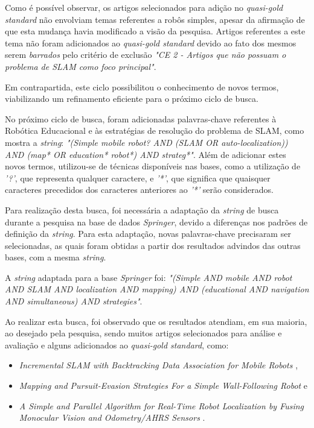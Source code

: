 		Como é possível observar, os artigos selecionados para adição no \textit{quasi-gold standard} não envolviam temas referentes a robôs simples, apesar da afirmação de que esta mudança havia modificado a visão da pesquisa. Artigos referentes a este tema não foram adicionados ao \textit{quasi-gold standard} devido ao fato dos mesmos serem \textit{barrados} pelo critério de exclusão \textit{"CE 2 - Artigos que não possuam o problema de SLAM como foco principal"}.

		Em contrapartida, este ciclo possibilitou o conhecimento de novos termos, viabilizando um refinamento eficiente para o próximo ciclo de busca.

		No próximo ciclo de busca, foram adicionadas palavras-chave referentes à Robótica Educacional e às estratégias de resolução do problema de SLAM, como mostra a \textit{string}: \textit{"(Simple mobile robot? AND (SLAM OR auto-localization)) AND (map* OR education* robot*) AND strateg*"}. Além de adicionar estes novos termos, utilizou-se de técnicas disponíveis nas bases, como a utilização de \textit{'?'}, que representa qualquer caractere, e \textit{'*'}, que significa que quaisquer caracteres precedidos dos caracteres anteriores ao \textit{'*'} serão considerados.

		Para realização desta busca, foi necessária a adaptação da \textit{string} de busca durante a pesquisa na base de dados \textit{Springer}, devido a diferenças nos padrões de definição da \textit{string}. Para esta adaptação, novas palavras-chave precisaram ser selecionadas, as quais foram obtidas a partir dos resultados advindos das outras bases, com a mesma \textit{string}.

		A \textit{string} adaptada para a base \textit{Springer} foi: \textit{"(Simple AND mobile AND robot AND SLAM AND localization AND mapping) AND (educational AND navigation AND simultaneous) AND strategies"}.

		Ao realizar esta busca, foi observado que os resultados atendiam, em sua maioria, ao desejado pela pesquisa, sendo muitos artigos selecionados para análise e avaliação e alguns adicionados ao \textit{quasi-gold standard}, como:

			\begin{itemize}
				\item \textit{Incremental SLAM with Backtracking Data Association for Mobile Robots} \cite{incrementalSLAM},
				\item \textit{Mapping and Pursuit-Evasion Strategies For a Simple Wall-Following Robot} \cite{wall_following} e
				\item \textit{A Simple and Parallel Algorithm for Real-Time Robot Localization by Fusing Monocular Vision and Odometry/AHRS Sensors} \cite{fusingSensorsParallel}.
			\end{itemize}

